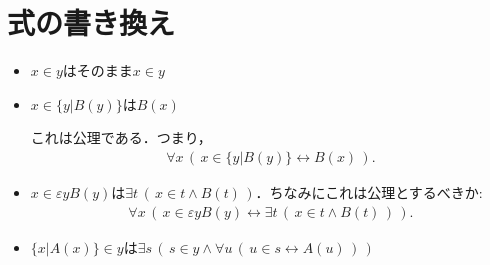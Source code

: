 \documentclass[a4j,10.5pt,oneside,openany]{jsbook}
\theoremstyle{mystyle}
\begin{document}
	
\section{式の書き換え}
	\begin{itemize}
		\item $x \in y$はそのまま$x \in y$
		\item $x \in \{y|B(y)\}$は$B(x)$
			
			これは公理である．つまり，
			\begin{align}
				\forall x\, \left(\, x \in \{y|B(y)\} \leftrightarrow B(x)\, \right).
			\end{align}
			
		\item $x \in \varepsilon y B(y)$は$\exists t\, \left(\, x \in t \wedge B(t)\, \right)$．ちなみにこれは公理とするべきか:
			\begin{align}
				\forall x\, \left(\, x \in \varepsilon y B(y) \leftrightarrow
				\exists t\, \left(\, x \in t \wedge B(t)\, \right)\, \right).
			\end{align}
			
		\item $\{x|A(x)\} \in y$は$\exists s\, \left(\, s \in y \wedge 
			\forall u\, \left(\, u \in s \leftrightarrow A(u)\, \right)\, \right)$
			

\end{itemize}
\end{document}
